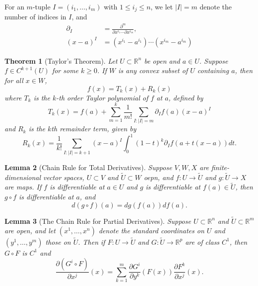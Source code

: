 \documentclass[reqno]{amsart}
\newtheorem{theorem}{Theorem}[section]
\newtheorem{lemma}[theorem]{Lemma}
\theoremstyle{definition}
\theoremstyle{remark}
\begin{document}
   For an $m$-tuple 
   $I = \left( i_1, \ldots, i_m \right) $ with
   $1 \le i_j \le n$, we let
   $\left| I \right| = m$ denote the number of indices
   in $I$, and
   \begin{align*}
       \partial_I 
       &= \frac{\partial^{m}}{\partial x^{i_1} \cdots
       \partial x^{i_m}},\\
       \left( x-a \right)^{I}
       &= \left( x^{i_1}-a^{i_1} \right) \cdots
       \left( x^{i_m} - a^{i_m} \right) 
   \end{align*}

   \begin{theorem}[Taylor's Theorem]
       Let $U \subset \mathbb{R}^{n}$ be open and
       $a \in U$. Suppose
       $f \in C^{k+1}(U)$ for some $k \ge 0$. If
       $W$ is any convex subset
       of $U$ containing $a$, then for all $x \in W$,
       \[
       f(x) = T_k(x) + R_k(x)
       \] 
       where
       $T_k$ is the \textit{$k$-th order Taylor
       polynomial of $f$ at $a$}, defined
       by
       \[
       T_k(x) = f(a) +
       \sum_{m=1}^{k} \frac{1}{m!} 
       \sum_{I \colon \left| I \right| =m}
       \partial_I f(a) (x-a)^{I}
       \] 
       and
       $R_k$ is the \textit{$k$th remainder term}, given
       by
       \[
       R_k(x) = \frac{1}{k!}
       \sum_{I \colon \left| I \right| =k+1}
       \left( x-a \right)^{I} \int_{0}^{1}
       (1-t)^{k} \partial_I f\left( a+ t(x-a) \right) dt.
       \] 
   \end{theorem}

   \begin{lemma}[Chain Rule for Total Derivatives]\label{Chain-Rule}
       Suppose $V,W,X$ are finite-dimensional vector spaces,
       $U \subset V$ and $\tilde{U}\subset W$ oepn,
       and $f \colon U \to \tilde{U}$ and
       $g \colon \tilde{U} \to X$ are maps.
       If $f$ is differentiable at $a \in U$ and
       $g$ is differentiable at $f(a) \in 
       \tilde{U}$, then
       $g \circ f$ is differentiable at $a$, and
       \[
       d \left( g \circ f \right) (a)
    = dg\left( f(a) \right) df(a).
       \] 
   \end{lemma}

   \begin{lemma}[The Chain Rule for Partial
       Derivatives]\label{chain-rule-partial-derivatives}
       Suppose $U \subset \mathbb{R}^{n}$ and
       $\tilde{U}\subset \mathbb{R}^{m}$ are open, and
       let $\left( x^{1},\ldots,x^{n} \right) $ denote the
       standard coordinates on $U$ and
       $\left( y^{1},\ldots, y^{m} \right) $ those
       on $\tilde{U}$.
       Then if $F \colon U \to \tilde{U}$ and
       $G \colon \tilde{U} \to \mathbb{R}^{p}$ are
       of class $C^{1}$, then
       $G \circ F$ is $C^{1}$ and
       \[
       \frac{\partial \left( G^{i} \circ F \right) }{\partial
       x^{j}} (x)
       = \sum_{k=1}^{m}
       \frac{\partial G^{i}}{\partial y^{k}}(F(x))
       \frac{\partial F^{k}}{\partial x^{j}}(x).
       \] 
   \end{lemma}
\end{document}
